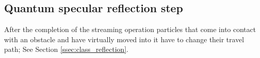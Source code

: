 






\subsection{Quantum specular reflection step}\label{sec:complete quantum specular reflection step}
After the completion of the streaming operation particles that come into contact with an obstacle and have virtually moved into it have to change their travel path; See Section \ref{ssec:class_reflection}. 

